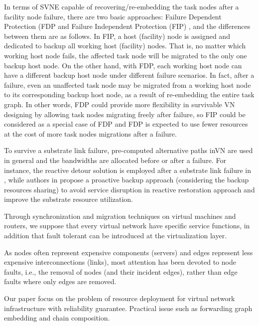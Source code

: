 In terms of SVNE capable of recovering/re-embedding the task nodes after a facility node failure, there are two basic approaches: Failure Dependent Protection (FDP \cite{yu2010survivable} and Failure Independent Protection (FIP) \cite{yeow2011designing}, and the differences between them are as follows. In FIP, a host (facility) node is assigned and dedicated to backup all working host (facility) nodes. That is, no matter which working host node fails, the affected task node will be migrated to the only one backup host node. On the other hand, with FDP, each working host node can have a different backup host node under different failure scenarios. In fact, after a failure, even an unaffected task node may be migrated from a working host node to its corresponding backup host node, as a result of re-embedding the entire task graph. In other words, FDP could provide more flexibility in survivable VN designing by allowing task nodes migrating freely after failure, so FIP could be considered as a special case of FDP and FDP is expected to use fewer resources at the cost of more task nodes migrations after a failure.


To survive a substrate link failure, pre-computed alternative paths inVN are used in general and the bandwidths are allocated before or after a failure. For instance, the reactive detour solution is employed after a substrate link failure in \cite{rahman2010survivable}, while authors in \cite{guo2011shared} propose a proactive backup approach (considering the backup resources sharing) to avoid service disruption in reactive restoration approach and improve the substrate resource utilization.

Through synchronization\cite{bressoud1996hypervisor,cully2008remus} and migration techniques\cite{clark2005live,wang2008virtual} on virtual machines and routers, we suppose that every virtual network have specific service functions, in addition that fault tolerant can be introduced at the virtualization layer\cite{yeow2011designing}.

As nodes often represent expensive components (servers) and edges represent less expensive interconnections (links), most attention has been devoted to node faults, i.e., the removal of nodes (and their incident edges), rather than edge faults where only edges are removed.

Our paper focus on the problem of resource deployment for virtual network infrastructure with reliability guarantee. Practical issue such as forwarding graph embedding and chain composition.

